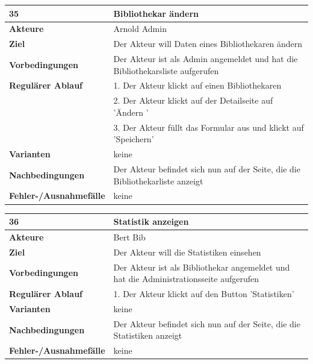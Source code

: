 \documentclass[fontsize=12pt,paper=a4,twoside]{scrartcl}
\begin{document}
\begin{table}[htbp]
\label{35}
\begin{tabular}{|l|p{10cm}|}
\hline 
\textbf{35} & \textbf{Bibliothekar ändern} \\ \hline
\textbf{Akteure} & Arnold Admin\\ \hline
\textbf{Ziel} & Der Akteur will Daten eines Bibliothekaren ändern \\ \hline
\textbf{Vorbedingungen} & Der Akteur ist als Admin angemeldet und hat die Bibliothekarsliste 
aufgerufen \\ \hline
\textbf{Regulärer Ablauf} & 
1. Der Akteur klickt auf einen Bibliothekaren \\
&2. Der Akteur klickt auf der Detailseite auf 'Ändern '\\
&3. Der Akteur füllt das Formular aus und klickt auf 'Speichern'\\
\hline
\textbf{Varianten} & 
keine \\ \hline
\textbf{Nachbedingungen} & Der Akteur befindet sich nun auf der Seite, die die Bibliothekarliste 
anzeigt\\ \hline
\textbf{Fehler-/Ausnahmefälle} & keine\\
\hline
\end{tabular}
\end{table}


\begin{table}[htbp]
\label{36}
\begin{tabular}{|l|p{10cm}|}
\hline 
\textbf{36} & \textbf{Statistik anzeigen} \\ \hline
\textbf{Akteure} & Bert Bib\\ \hline
\textbf{Ziel} & Der Akteur will die Statistiken einsehen \\ \hline
\textbf{Vorbedingungen} & Der Akteur ist als Bibliothekar angemeldet und hat die Administrationsseite 
aufgerufen \\ \hline
\textbf{Regulärer Ablauf} & 
1. Der Akteur klickt auf den Button 'Statistiken' \\
\hline
\textbf{Varianten} & 
keine \\ \hline
\textbf{Nachbedingungen} & Der Akteur befindet sich nun auf der Seite, die die Statistiken anzeigt\\
\hline
\textbf{Fehler-/Ausnahmefälle} & keine\\
\hline
\end{tabular}
\end{table}
\end{document}
